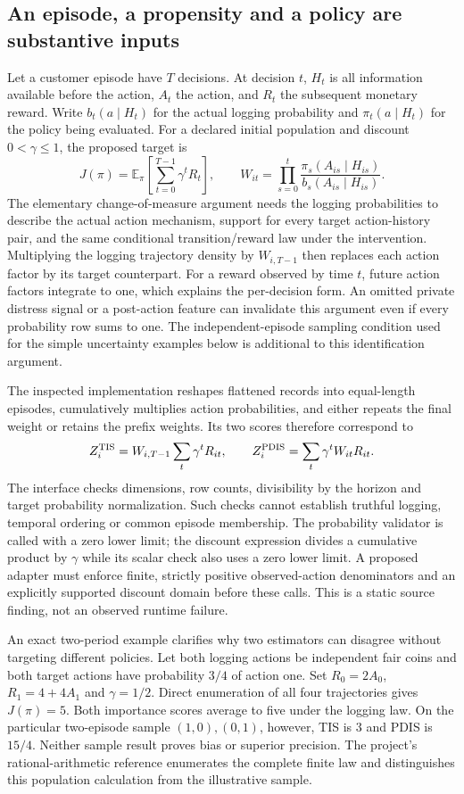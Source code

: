 \subsection{An episode, a propensity and a policy are substantive inputs}
\label{exec23:scope-rl-target}
Let a customer episode have $T$ decisions. At decision $t$, $H_t$ is all
information available before the action, $A_t$ the action, and $R_t$ the
subsequent monetary reward. Write $b_t(a\mid H_t)$ for the actual logging
probability and $\pi_t(a\mid H_t)$ for the policy being evaluated. For a declared
initial population and discount $0<\gamma\leq1$, the proposed target is
\[
 J(\pi)=\mathbb E_\pi\!\left[\sum_{t=0}^{T-1}\gamma^tR_t\right],
 \qquad
 W_{it}=\prod_{s=0}^{t}
 \frac{\pi_s(A_{is}\mid H_{is})}{b_s(A_{is}\mid H_{is})}.
\]
The elementary change-of-measure argument needs the logging probabilities to
describe the actual action mechanism, support for every target action-history
pair, and the same conditional transition/reward law under the intervention.
Multiplying the logging trajectory density by $W_{i,T-1}$ then replaces each
action factor by its target counterpart. For a reward observed by time $t$,
future action factors integrate to one, which explains the per-decision form.
An omitted private distress signal or a post-action feature can invalidate this
argument even if every probability row sums to one. The independent-episode
sampling condition used for the simple uncertainty examples below is additional
to this identification argument.

The inspected implementation reshapes flattened records into equal-length
episodes, cumulatively multiplies action probabilities, and either repeats the
final weight or retains the prefix weights. Its two scores therefore correspond
to
\[
 Z_i^{\rm TIS}=W_{i,T-1}\sum_t\gamma^tR_{it},
 \qquad Z_i^{\rm PDIS}=\sum_t\gamma^tW_{it}R_{it}.
\]
The interface checks dimensions, row counts, divisibility by the horizon and
target probability normalization. Such checks cannot establish truthful
logging, temporal ordering or common episode membership. The probability
validator is called with a zero lower limit; the discount expression divides a
cumulative product by $\gamma$ while its scalar check also uses a zero lower
limit. A proposed adapter must enforce finite, strictly positive observed-action
denominators and an explicitly supported discount domain before these calls.
This is a static source finding, not an observed runtime failure.
\citep{exec23_scope_rl_sources}

An exact two-period example clarifies why two estimators can disagree without
targeting different policies. Let both logging actions be independent fair
coins and both target actions have probability $3/4$ of action one. Set
$R_0=2A_0$, $R_1=4+4A_1$ and $\gamma=1/2$. Direct enumeration of all four
trajectories gives $J(\pi)=5$. Both importance scores average to five under the
logging law. On the particular two-episode sample $(1,0),(0,1)$, however, TIS is
$3$ and PDIS is $15/4$. Neither sample result proves bias or superior precision.
The project's rational-arithmetic reference enumerates the complete finite law
and distinguishes this population calculation from the illustrative sample.
\citep{exec23_scope_rl_reference}

